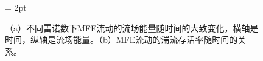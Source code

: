 \begin{figure}[H]
	\subfigbottomskip = 2pt
	\begin{minipage}[h]{0.54\linewidth}
	\centering
	\end{minipage}
	\quad
	\begin{minipage}[h]{0.45\linewidth}
	\centering
	\end{minipage}
	\quad
	\caption{（a）不同雷诺数下MFE流动的流场能量随时间的大致变化\cite{Anton2023}，横轴是时间，纵轴是流场能量。（b）MFE流动的湍流存活率随时间的关系。}
\label{fig:MFE_decay}
\end{figure}


